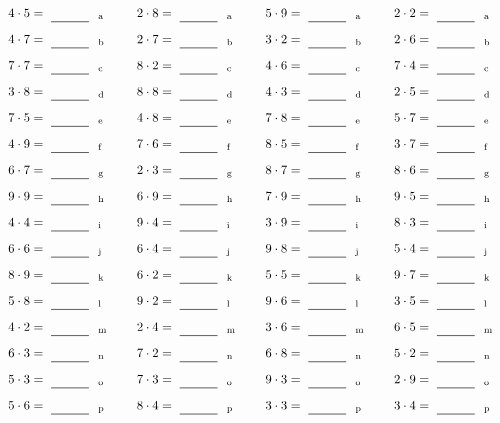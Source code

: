 \documentclass
[
  draft    = true,
  fontsize = 11pt,
  parskip  = half-
]
{scrartcl}
\begin{document}
\par\vfill\par
\begin{align*}
    \pline{4\cdot5}&=\rline{a}
  & \pline{2\cdot8}&=\rline{a}
  & \pline{5\cdot9}&=\rline{a}
  & \pline{2\cdot2}&=\rline{a} \\[1ex]
    \pline{4\cdot7}&=\rline{b}
  & \pline{2\cdot7}&=\rline{b}
  & \pline{3\cdot2}&=\rline{b}
  & \pline{2\cdot6}&=\rline{b} \\[1ex]
    \pline{7\cdot7}&=\rline{c}
  & \pline{8\cdot2}&=\rline{c}
  & \pline{4\cdot6}&=\rline{c}
  & \pline{7\cdot4}&=\rline{c} \\[1ex]
    \pline{3\cdot8}&=\rline{d}
  & \pline{8\cdot8}&=\rline{d}
  & \pline{4\cdot3}&=\rline{d}
  & \pline{2\cdot5}&=\rline{d} \\[1ex]
    \pline{7\cdot5}&=\rline{e}
  & \pline{4\cdot8}&=\rline{e}
  & \pline{7\cdot8}&=\rline{e}
  & \pline{5\cdot7}&=\rline{e} \\[1ex]
    \pline{4\cdot9}&=\rline{f}
  & \pline{7\cdot6}&=\rline{f}
  & \pline{8\cdot5}&=\rline{f}
  & \pline{3\cdot7}&=\rline{f} \\[1ex]
    \pline{6\cdot7}&=\rline{g}
  & \pline{2\cdot3}&=\rline{g}
  & \pline{8\cdot7}&=\rline{g}
  & \pline{8\cdot6}&=\rline{g} \\[1ex]
    \pline{9\cdot9}&=\rline{h}
  & \pline{6\cdot9}&=\rline{h}
  & \pline{7\cdot9}&=\rline{h}
  & \pline{9\cdot5}&=\rline{h} \\[1ex]
    \pline{4\cdot4}&=\rline{i}
  & \pline{9\cdot4}&=\rline{i}
  & \pline{3\cdot9}&=\rline{i}
  & \pline{8\cdot3}&=\rline{i} \\[1ex]
    \pline{6\cdot6}&=\rline{j}
  & \pline{6\cdot4}&=\rline{j}
  & \pline{9\cdot8}&=\rline{j}
  & \pline{5\cdot4}&=\rline{j} \\[1ex]
    \pline{8\cdot9}&=\rline{k}
  & \pline{6\cdot2}&=\rline{k}
  & \pline{5\cdot5}&=\rline{k}
  & \pline{9\cdot7}&=\rline{k} \\[1ex]
    \pline{5\cdot8}&=\rline{l}
  & \pline{9\cdot2}&=\rline{l}
  & \pline{9\cdot6}&=\rline{l}
  & \pline{3\cdot5}&=\rline{l} \\[1ex]
    \pline{4\cdot2}&=\rline{m}
  & \pline{2\cdot4}&=\rline{m}
  & \pline{3\cdot6}&=\rline{m}
  & \pline{6\cdot5}&=\rline{m} \\[1ex]
    \pline{6\cdot3}&=\rline{n}
  & \pline{7\cdot2}&=\rline{n}
  & \pline{6\cdot8}&=\rline{n}
  & \pline{5\cdot2}&=\rline{n} \\[1ex]
    \pline{5\cdot3}&=\rline{o}
  & \pline{7\cdot3}&=\rline{o}
  & \pline{9\cdot3}&=\rline{o}
  & \pline{2\cdot9}&=\rline{o} \\[1ex]
    \pline{5\cdot6}&=\rline{p}
  & \pline{8\cdot4}&=\rline{p}
  & \pline{3\cdot3}&=\rline{p}
  & \pline{3\cdot4}&=\rline{p}
\end{align*}
\end{document}

